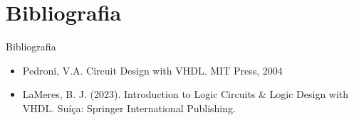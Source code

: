 \documentclass[aspectratio=169]{beamer}
\begin{document}
\section{Bibliografia}
\begin{frame}{Bibliografia}
	\justifying
	
	\begin{itemize}
		\item Pedroni, V.A. Circuit Design with VHDL. MIT Press, 2004
		\item LaMeres, B. J. (2023). Introduction to Logic Circuits \& Logic Design with VHDL. Suíça: Springer International Publishing.
	\end{itemize}
	
\end{frame}
\end{document}
